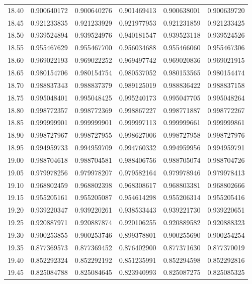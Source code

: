 \documentclass[11pt,a4paper]{article}
\begin{document}
\begin{longtable}{rrrrrr}
18.40 & 0.900640172 & 0.900640276 & 0.901469413 & 0.900638001 & 0.900639720 \\
18.45 & 0.921233835 & 0.921233929 & 0.921977953 & 0.921231859 & 0.921233425 \\
18.50 & 0.939524894 & 0.939524976 & 0.940181547 & 0.939523118 & 0.939524526 \\
18.55 & 0.955467629 & 0.955467700 & 0.956034688 & 0.955466060 & 0.955467306 \\
18.60 & 0.969022193 & 0.969022252 & 0.969497742 & 0.969020836 & 0.969021915 \\
18.65 & 0.980154706 & 0.980154754 & 0.980537052 & 0.980153565 & 0.980154474 \\
18.70 & 0.988837343 & 0.988837379 & 0.989125019 & 0.988836422 & 0.988837158 \\
18.75 & 0.995048401 & 0.995048425 & 0.995240173 & 0.995047705 & 0.995048264 \\
18.80 & 0.998772357 & 0.998772369 & 0.998867227 & 0.998771887 & 0.998772267 \\
18.85 & 0.999999901 & 0.999999901 & 0.999997113 & 0.999999661 & 0.999999861 \\
18.90 & 0.998727967 & 0.998727955 & 0.998627006 & 0.998727958 & 0.998727976 \\
18.95 & 0.994959733 & 0.994959709 & 0.994760332 & 0.994959956 & 0.994959791 \\
19.00 & 0.988704618 & 0.988704581 & 0.988406756 & 0.988705074 & 0.988704726 \\
19.05 & 0.979978256 & 0.979978207 & 0.979582164 & 0.979978946 & 0.979978413 \\
19.10 & 0.968802459 & 0.968802398 & 0.968308617 & 0.968803381 & 0.968802666 \\
19.15 & 0.955205161 & 0.955205087 & 0.954614298 & 0.955206314 & 0.955205416 \\
19.20 & 0.939220347 & 0.939220261 & 0.938533443 & 0.939221730 & 0.939220651 \\
19.25 & 0.920887971 & 0.920887874 & 0.920106255 & 0.920889582 & 0.920888323 \\
19.30 & 0.900253855 & 0.900253746 & 0.899378801 & 0.900255690 & 0.900254254 \\
19.35 & 0.877369573 & 0.877369452 & 0.876402900 & 0.877371630 & 0.877370019 \\
19.40 & 0.852292324 & 0.852292192 & 0.851235991 & 0.852294598 & 0.852292816 \\
19.45 & 0.825084788 & 0.825084645 & 0.823940993 & 0.825087275 & 0.825085325 \\

\end{longtable}
\end{document}
